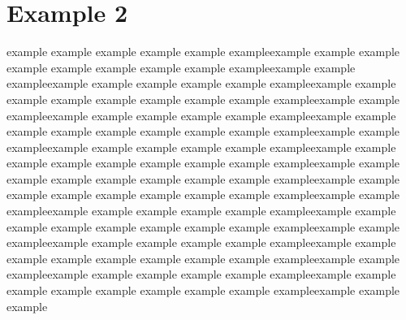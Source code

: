 \section{Example 2}
example example example example example exampleexample example example\newline
example example example example example exampleexample example example\newline example example example example example exampleexample example example\newline
example example example example example exampleexample example example\newline example example example example example exampleexample example example\newline
example example example example example exampleexample example example\newline example example example example example exampleexample example example\newline
example example example example example exampleexample example example\newline
\newpage
example example example example example exampleexample example example\newline
example example example example example exampleexample example example\newline example example example example example exampleexample example example\newline
example example example example example exampleexample example example\newline example example example example example exampleexample example example\newline
example example example example example exampleexample example example\newline example example example example example exampleexample example example\newline
example example example example example exampleexample example example\newline